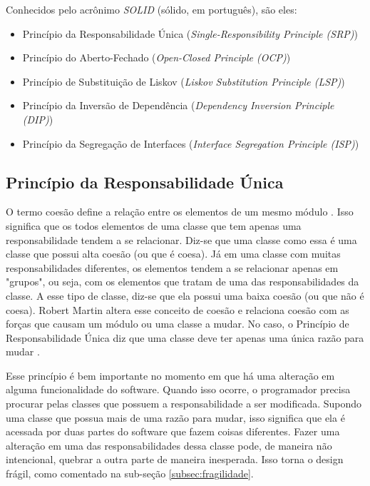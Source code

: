 Conhecidos pelo acrônimo \textit{SOLID} (sólido, em português), são eles:

\begin{itemize}
	\item Princípio da Responsabilidade Única (\textit{Single-Responsibility 
	Principle (SRP)})
	\item Princípio do Aberto-Fechado (\textit{Open-Closed Principle (OCP)})
	\item Princípio de Substituição de Liskov (\textit{Liskov Substitution 
	Principle (LSP)})
	\item Princípio da Inversão de Dependência (\textit{Dependency Inversion
	Principle (DIP)})
	\item Princípio da Segregação de Interfaces (\textit{Interface Segregation 
	Principle (ISP)})
\end{itemize}

\subsection{Princípio da Responsabilidade Única}
\label{subsec:principio-srp}

O termo coesão define a relação entre os elementos de um mesmo módulo
\cite{demarco} \cite{pagejones}. Isso significa que os todos elementos de uma 
classe que tem apenas uma responsabilidade tendem a se relacionar. Diz-se que
uma classe como essa é uma classe que possui alta coesão (ou que é coesa). 
Já em uma classe com muitas responsabilidades diferentes, os elementos tendem a
se relacionar apenas em "grupos", ou seja, com os elementos que tratam de uma 
das responsabilidades da classe. A esse tipo de classe, diz-se que ela possui 
uma baixa coesão (ou que não é coesa).
Robert Martin altera esse conceito de coesão e relaciona coesão com as forças
que  causam um módulo ou uma classe a mudar. No caso, o Princípio de
Responsabilidade Única diz que uma classe deve ter apenas uma única razão para 
mudar \cite{bob-martin}.

Esse princípio é bem importante no momento em que há uma alteração em alguma 
funcionalidade do software. Quando isso ocorre, o programador precisa procurar 
pelas classes que possuem a responsabilidade a ser modificada. Supondo uma
classe  que possua mais de uma razão para mudar, isso significa que ela é
acessada  por duas partes do software que fazem coisas diferentes.  Fazer uma
alteração em uma das responsabilidades dessa classe pode, de maneira não
intencional, quebrar a outra parte de maneira inesperada. Isso torna o design
frágil, como comentado na sub-seção \ref{subsec:fragilidade}.

